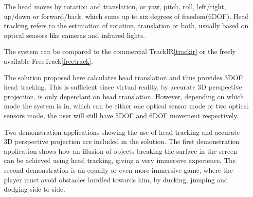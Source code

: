 The head moves by rotation and translation, or
yaw, pitch, roll, left/right, up/down or forward/back, which sums up to six degrees of freedom(6DOF).
Head tracking refers to the estimation of rotation, translation or both, usually based on 
optical sensors like cameras and infrared lights.

The system can be compared to the commercial TrackIR\ref{trackir} or the freely available FreeTrack\ref{freetrack}.

The solution proposed here calculates head translation and thus provides 3DOF head tracking. 
This is sufficient since virtual reality, by accurate 3D perspective projection, is only dependant on head translation.
However, depending on which mode the system is in, which can be either one optical sensor mode or two optical sensors mode,
the user will still have 5DOF and 6DOF movement respectively. 

Two demonstration applications showing the use of head tracking and accurate 3D perspective projection are included in the solution.
The first demonstration application shows how an illusion of objects breaking the surface in the screen can be achieved using head tracking,
giving a very immersive experience. The second demonstration is an equally or even more immersive game, where the player must avoid
obstacles hurdled towards him, by ducking, jumping and dodging side-to-side.
